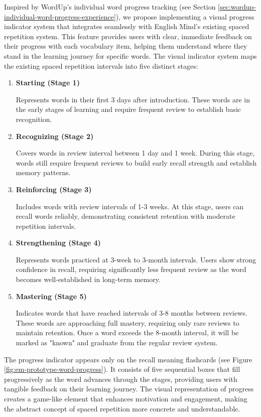 Inspired by WordUp's individual word progress tracking (see Section \ref{sec:wordup-individual-word-progress-experience}), we propose implementing a visual progress indicator system that integrates seamlessly with English Mind's existing spaced repetition system. This feature provides users with clear, immediate feedback on their progress with each vocabulary item, helping them understand where they stand in the learning journey for specific words. The visual indicator system maps the existing spaced repetition intervals into five distinct stages:
\begin{enumerate}
    \item \textbf{Starting (Stage 1)}
    
    Represents words in their first 3 days after introduction. These words are in the early stages of learning and require frequent review to establish basic recognition.
    
    \item \textbf{Recognizing (Stage 2)}
    
    Covers words in review interval between 1 day and 1 week. During this stage, words still require frequent reviews to build early recall strength and establish memory patterns.
    
    \item \textbf{Reinforcing (Stage 3)}
    
    Includes words with review intervals of 1-3 weeks. At this stage, users can recall words reliably, demonstrating consistent retention with moderate repetition intervals.
    
    \item \textbf{Strengthening (Stage 4)}
    
    Represents words practiced at 3-week to 3-month intervals. Users show strong confidence in recall, requiring significantly less frequent review as the word becomes well-established in long-term memory.
    
    \item \textbf{Mastering (Stage 5)}
    
    Indicates words that have reached intervals of 3-8 months between reviews. These words are approaching full mastery, requiring only rare reviews to maintain retention. Once a word exceeds the 8-month interval, it will be marked as "known" and graduate from the regular review system.
\end{enumerate}

The progress indicator appears only on the recall meaning flashcards (see Figure \ref{fig:em-prototype-word-progress}). It consists of five sequential boxes that fill progressively as the word advances through the stages, providing users with tangible feedback on their learning journey. The visual representation of progress creates a game-like element that enhances motivation and engagement, making the abstract concept of spaced repetition more concrete and understandable.

